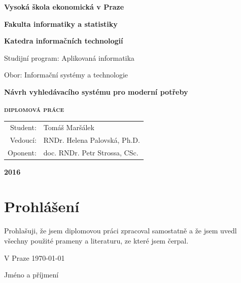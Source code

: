 \documentclass[11pt,letterpaper,oneside,openright]{book}
\begin{document}
\frontmatter

\begin{titlepage}
\thispagestyle{empty}
\centering
\begingroup
{\LARGE\bfseries Vysoká škola ekonomická v Praze\par}
{\Large\bfseries Fakulta informatiky a statistiky\par}
{\Large\bfseries Katedra informačních technologií\par}
\vspace{1.8cm}
{\large Studijní program: Aplikovaná informatika\par}
\vspace{.2em}
{\large Obor: Informační systémy a technologie\par}
\vspace{1.8cm}
{\Huge\bfseries Návrh vyhledávacího systému pro moderní potřeby\par}
\vspace{.5cm}
{\scshape\LARGE\bfseries diplomová práce\par}
\vspace{4.2cm}
\def\arraystretch{1.6}
\begin{tabular}{rl}
{\Large Student:} & {\Large Tomáš Maršálek \par} \\
{\Large Vedoucí:} & {\Large RNDr. Helena Palovská, Ph.D. \par} \\
{\Large Oponent:} & {\Large doc. RNDr. Petr Strossa, CSc. \par} \\
\end{tabular}
\par
\vspace{4cm}
{\Large\bfseries 2016\par}
\vfill
\endgroup
\end{titlepage}

\newpage
\chapter*{Prohlášení}
\noindent Prohlašuji, že jsem diplomovou práci zpracoval samostatně a že jsem uvedl
všechny použité prameny a literaturu, ze které jsem čerpal.\par
\vspace{2.4cm}
\noindent V Praze \today \hfill \dotfill \hspace{2em} \par
\hfill \strut Jméno a příjmení \hspace{3.5em} \strut
\end{document}
